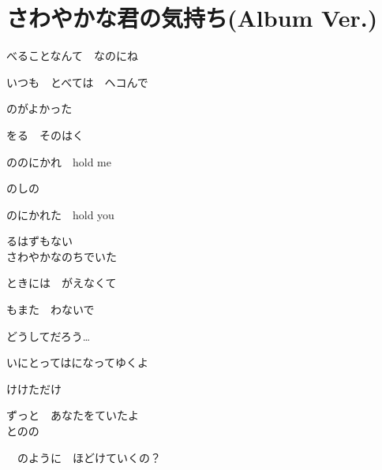 \section{ さわやかな君の気持ち(Album Ver.)}


\large{

べることなんて　なのにね

いつも　とべては　ヘコんで

のがよかった

をる　そのはく

ののにかれ　hold me

のしの

のにかれた　hold you

るはずもない
\\

さわやかなのちでいた

ときには　がえなくて

もまた　わないで

どうしてだろう…

いにとってはになってゆくよ

けけただけ

ずっと　あなたをていたよ
\\

とのの

　のように　ほどけていくの？

}
